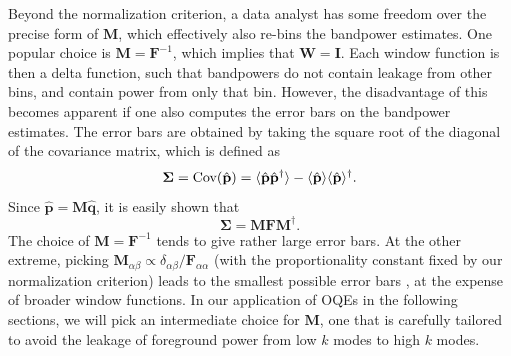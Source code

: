\documentclass[twocolumn,numberedappendix]{emulateapj} \shorttitle{New Limits on the 21 cm Power Spectrum at $z=8.4$}
\newcommand{\phat}{\hat{\mathbf{p}}}
\newcommand{\qhat}{\hat{\mathbf{q}}}
\begin{document}
%
Beyond the normalization criterion, a data analyst has some freedom over the
precise form of $\mathbf{M}$, which effectively also re-bins the bandpower estimates. One 
popular choice is $\mathbf{M} = \mathbf{F}^{-1}$, which implies that $\mathbf{W} = \mathbf{I}$. Each
window function is then a delta function, such that bandpowers do not
contain leakage from other bins, and contain power from only that bin. However, the disadvantage
of this becomes apparent if one also computes the error bars on the bandpower estimates.
The error bars are obtained by taking the square root of the diagonal of the covariance matrix, which is defined as
\begin{equation}\label{eqn:err_cov}
    \boldsymbol \Sigma = \text{Cov}(\hat{\mathbf{p}}) = \expval{\hat{\mathbf{p}}\hat{\mathbf{p}}^{\dagger}} -
             \expval{\hat{\mathbf{p}}}\expval{\hat{\mathbf{p}}}^{\dagger}.
\end{equation}
Since $\phat = \mathbf{M}\qhat$, it is easily shown that 
\begin{equation}
\label{eq:MFM}
  \boldsymbol  \Sigma = \mathbf{M}\mathbf{F}\mathbf{M}^{\dagger}.
\end{equation}
The choice of $\mathbf{M} = \mathbf{F}^{-1}$ tends to give rather large error bars.
At the other extreme, picking $\mathbf{M}_{\alpha \beta} \propto \delta_{\alpha \beta} / \mathbf{F}_{\alpha \alpha}$ (with the proportionality constant fixed by our normalization criterion) 
leads to the smallest possible error bars \citep{tegmark1997}, at the expense of broader
window functions. In our application of OQEs in the following sections, we will pick an intermediate
choice for $\mathbf{M}$, one that is carefully tailored to avoid the leakage of foreground power
from low $k$ modes to high $k$ modes.
\end{document}
